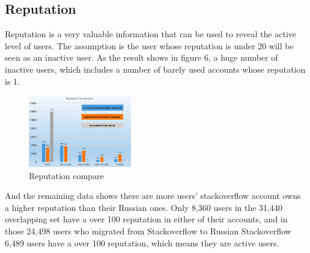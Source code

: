 \documentclass[A4paper,twoside,twocolumn]{article}
\begin{document}
\subsection{Reputation}
Reputation is a very valuable information that can be used to reveal the active level of users. The assumption is the user whose reputation is under 20 will be seen as an inactive user. As the result shows in figure 6, a huge number of inactive users, which includes a number of barely used accounts whose reputation is 1. 
	\begin{figure}[H]
		\includegraphics[width = 0.4\textwidth]{user3.png}
		\caption{Reputation compare}
  	\end{figure}
And the remaining data shows there are more users' stackoverflow account owns a higher reputation than their Russian ones. Only 8,360 users in the 31,440 overlapping set have a over 100 reputation in either of their accounts, and in those 24,498 users who migrated from Stackoverflow to Russian Stackoverflow 6,489 users have a over 100 reputation, which means they are active users. 
\end{document}
